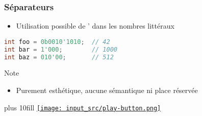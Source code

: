 \documentclass[C++.tex]{subfiles}
\begin{document}
\begin{frame}[fragile]
	\frametitle{Séparateurs}
	\begin{itemize}
		\item Utilisation possible de ' dans les nombres littéraux
	\end{itemize}

	\begin{lstlisting}[language=C++]
int foo = 0b0010'1010;  // 42
int bar = 1'000;        // 1000
int baz = 010'00;       // 512\end{lstlisting}

	\begin{block}{Note}
		\begin{itemize}
			\item Purement esthétique, aucune sémantique ni place réservée
		\end{itemize}
	\end{block}

	\vskip 10mm plus 10fill
	\hfill
	\href{https://godbolt.org/#g:!((g:!((g:!((h:codeEditor,i:(filename:'1',fontScale:14,fontUsePx:'0',j:1,lang:c%2B%2B,selection:(endColumn:1,endLineNumber:8,positionColumn:1,positionLineNumber:8,selectionStartColumn:1,selectionStartLineNumber:8,startColumn:1,startLineNumber:8),source:'%23include+%3Ciostream%3E%0A%0Aint+main()%0A%7B%0A++std::cout+%3C%3C+0b0010!'1010+%3C%3C+!'%5Cn!'%3B%0A++std::cout+%3C%3C+1!'000+%3C%3C+!'%5Cn!'%3B%0A++std::cout+%3C%3C+010!'00+%3C%3C+!'%5Cn!'%3B%0A%7D%0A'),l:'5',n:'0',o:'C%2B%2B+source+%231',t:'0')),k:50,l:'4',n:'0',o:'',s:0,t:'0'),(g:!((h:executor,i:(argsPanelShown:'1',compilationPanelShown:'0',compiler:g112,compilerOutShown:'0',execArgs:'',execStdin:'',fontScale:14,fontUsePx:'0',j:1,lang:c%2B%2B,libs:!((name:boost,ver:'175')),options:'-std%3Dc%2B%2B14',source:1,stdinPanelShown:'1',tree:'1',wrap:'0'),l:'5',n:'0',o:'Executor+x86-64+gcc+11.2+(C%2B%2B,+Editor+%231)',t:'0')),header:(),k:50,l:'4',n:'0',o:'',s:0,t:'0')),l:'2',n:'0',o:'',t:'0')),version:4}{\texttt{[image: input\_src/play-button.png]}}
\end{frame}
\end{document}
